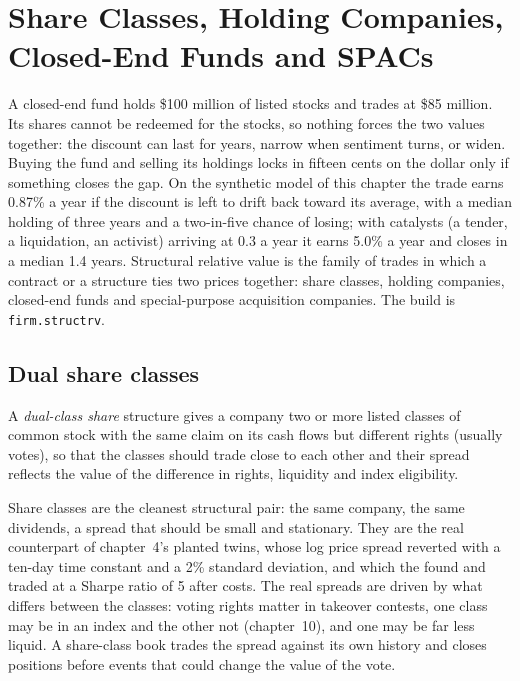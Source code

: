 \chapter{Share Classes, Holding Companies, Closed-End Funds and SPACs}\label{ch:s1:share-classes-holding-companies-closed-end-funds-spacs}

A closed-end fund holds \$100 million of listed stocks and trades at \$85 million. Its shares cannot be redeemed for the stocks, so nothing forces the
two values together: the discount can last for years, narrow when sentiment turns, or widen. Buying the fund and selling its holdings locks in
fifteen cents on the dollar only if something closes the gap. On the synthetic model of this chapter the trade earns 0.87\% a year if the discount is left
to drift back toward its average, with a median holding of three years and a two-in-five chance of losing; with catalysts (a tender, a liquidation, an
activist) arriving at 0.3 a year it earns 5.0\% a year and closes in a median 1.4 years. Structural relative value is the family of trades in which a
contract or a structure ties two prices together: share classes, holding companies, closed-end funds and special-purpose acquisition companies. The
build is \texttt{firm.structrv}.

\section{Dual share classes}

\begin{definition}\label{def:s1:share-classes-holding-companies-closed-end-funds-spacs:dual}
A \emph{dual-class share} structure gives a company two or more listed classes of common stock with the same claim on its cash flows but different rights
(usually votes), so that the classes should trade close to each other and their spread reflects the value of the difference in rights, liquidity and index
eligibility.
\end{definition}

Share classes are the cleanest structural pair: the same company, the same dividends, a spread that should be small and stationary. They are the real
counterpart of chapter~4's planted twins, whose log price spread reverted with a ten-day time constant and a 2\% standard deviation, and which the
 found and traded at a Sharpe ratio of 5 after costs. The real spreads are driven by what differs between the classes: voting rights
matter in takeover contests, one class may be in an index and the other not (chapter~10), and one may be far less liquid. A share-class book trades the
spread against its own history and closes positions before events that could change the value of the vote.


